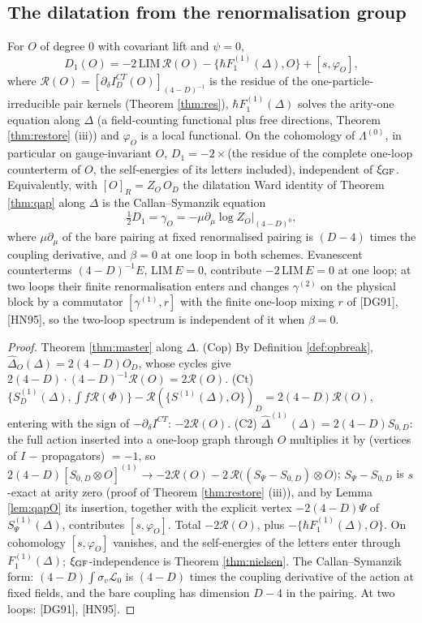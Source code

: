 \subsection{The dilatation from the renormalisation group}

\begin{theorem}[$D_1$ in DR]
\label{thm:D1}
For $O$ of degree $0$ with covariant lift and $\psi=0$,
\[
D_1(O)=-2\,\mathrm{LIM}\,\mathcal R(O)-\{\hbar F^{(1)}_1(\Delta),O\}+[s,\varphi_O],
\]
where $\mathcal R(O)=[\partial_\delta I^{CT}_D(O)]_{(4-D)^{-1}}$ is the residue of the one-particle-irreducible pair kernels (Theorem \ref{thm:res}), $\hbar F^{(1)}_1(\Delta)$ solves the arity-one equation along $\Delta$ (a field-counting functional plus free directions, Theorem \ref{thm:restore} (iii)) and $\varphi_O$ is a local functional. On the cohomology of $\Lambda^{(0)}$, in particular on gauge-invariant $O$, $D_1=-2\times$(the residue of the complete one-loop counterterm of $O$, the self-energies of its letters included), independent of $\xi_{\rm GF}$. Equivalently, with $[O]_R=Z_O\,O_D$ the dilatation Ward identity of Theorem \ref{thm:qap} along $\Delta$ is the Callan--Symanzik equation
\[
\tfrac12D_1=\gamma_O=-\mu\partial_\mu\log Z_O\big|_{(4-D)^0},
\]
where $\mu\partial_\mu$ of the bare pairing at fixed renormalised pairing is $(D-4)$ times the coupling derivative, and $\beta=0$ at one loop in both schemes. Evanescent counterterms $(4-D)^{-1}E$, $\mathrm{LIM}\,E=0$, contribute $-2\,\mathrm{LIM}\,E=0$ at one loop; at two loops their finite renormalisation enters and changes $\gamma^{(2)}$ on the physical block by a commutator $[\gamma^{(1)},r]$ with the finite one-loop mixing $r$ of [DG91], [HN95], so the two-loop spectrum is independent of it when $\beta=0$.
\end{theorem}

\begin{proof}
Theorem \ref{thm:master} along $\Delta$. (Cop) By Definition \ref{def:opbreak}, $\widehat\Delta_O(\Delta)=2(4-D)O_D$, whose cycles give $2(4-D)\cdot(4-D)^{-1}\mathcal R(O)=2\mathcal R(O)$. (Ct) $\{S^{(1)}_D(\Delta),\int f\mathcal R(\Phi)\}-\mathcal R(\{S^{(1)}(\Delta),O\})_D=2(4-D)\mathcal R(O)$, entering with the sign of $-\partial_\delta I^{CT}$: $-2\mathcal R(O)$. (C2) $\widehat\Delta^{(1)}(\Delta)=2(4-D)S_{0,D}$: the full action inserted into a one-loop graph through $O$ multiplies it by (vertices of $I$ $-$ propagators) $=-1$, so $2(4-D)[S_{0,D}\otimes O]^{(1)}\to-2\mathcal R(O)-2\,\mathcal R\big((S_\Psi-S_{0,D})\otimes O\big)$; $S_\Psi-S_{0,D}$ is $s$-exact at arity zero (proof of Theorem \ref{thm:restore} (iii)), and by Lemma \ref{lem:qapO} its insertion, together with the explicit vertex $-2(4-D)\Psi$ of $S^{(1)}_\Psi(\Delta)$, contributes $[s,\varphi_O]$. Total $-2\mathcal R(O)$, plus $-\{\hbar F_1^{(1)}(\Delta),O\}$. On cohomology $[s,\varphi_O]$ vanishes, and the self-energies of the letters enter through $F_1^{(1)}(\Delta)$; $\xi_{\rm GF}$-independence is Theorem \ref{thm:nielsen}. The Callan--Symanzik form: $(4-D)\int\sigma_v\mathscr L_0$ is $(4-D)$ times the coupling derivative of the action at fixed fields, and the bare coupling has dimension $D-4$ in the pairing. At two loops: [DG91], [HN95].
\end{proof}

